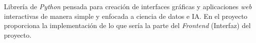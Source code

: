 Librería de \textit{Python} pensada para creación de interfaces gráficas y aplicaciones \textit{web} interactivas de manera simple y enfocada a ciencia de datos e IA. En el proyecto proporciona la implementación de lo que sería la parte del \textit{Frontend} (Interfaz) del proyecto.